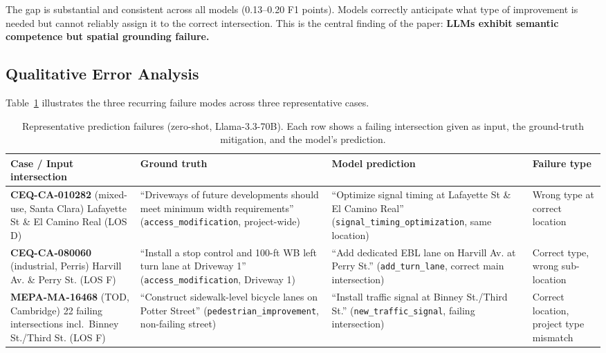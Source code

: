 \documentclass[preprint,12pt]{elsarticle}
\begin{document}
The gap is substantial and consistent across all models (0.13--0.20 F1 points).
Models correctly anticipate what type of improvement is needed but cannot
reliably assign it to the correct intersection.
This is the central finding of the paper: \textbf{LLMs exhibit semantic
competence but spatial grounding failure.}

\subsection{Qualitative Error Analysis}

Table~\ref{tab:qualitative} illustrates the three recurring failure modes
across three representative cases.

\begin{table}[ht]
\centering
\caption{Representative prediction failures (zero-shot, Llama-3.3-70B).
Each row shows a failing intersection given as input, the ground-truth
mitigation, and the model's prediction.}
\label{tab:qualitative}
\begin{tabular}{p{3.8cm}p{4.2cm}p{4.2cm}p{2.4cm}}
\toprule
Case / Input intersection & Ground truth & Model prediction & Failure type \\
\midrule
\textbf{CEQ-CA-010282} (mixed-use, Santa Clara)
Lafayette St \& El Camino Real (LOS D) &
``Driveways of future developments should meet minimum width requirements''
(\texttt{access\_modification}, project-wide) &
``Optimize signal timing at Lafayette St \& El Camino Real''
(\texttt{signal\_timing\_optimization}, same location) &
Wrong type at correct location \\
\addlinespace
\textbf{CEQ-CA-080060} (industrial, Perris)
Harvill Av. \& Perry St. (LOS F) &
``Install a stop control and 100-ft WB left turn lane at Driveway 1''
(\texttt{access\_modification}, Driveway 1) &
``Add dedicated EBL lane on Harvill Av. at Perry St.''
(\texttt{add\_turn\_lane}, correct main intersection) &
Correct type, wrong sub-location \\
\addlinespace
\textbf{MEPA-MA-16468} (TOD, Cambridge)
22 failing intersections incl.\ Binney St./Third St. (LOS F) &
``Construct sidewalk-level bicycle lanes on Potter Street''
(\texttt{pedestrian\_improvement}, non-failing street) &
``Install traffic signal at Binney St./Third St.''
(\texttt{new\_traffic\_signal}, failing intersection) &
Correct location, project type mismatch \\
\bottomrule
\end{tabular}
\end{table}
\end{document}

